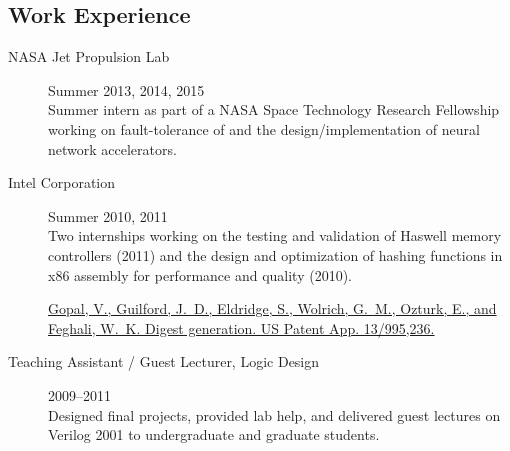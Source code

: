 \documentclass[letterpage]{article}
\begin{document}
\begin{minipage}[t]{0.59\textwidth}
\begin{description}
    \endgroup
  \end{description}

  \subsection*{Work Experience}
  \vspace{-5pt}
  \begin{description}
  \item[NASA Jet Propulsion Lab] \hfill Summer 2013, 2014, 2015\\ Summer intern as part of a NASA Space Technology Research Fellowship working on fault-tolerance of and the design/implementation of neural network accelerators.
  \item[Intel Corporation] \hfill Summer 2010, 2011\\ Two internships working on the testing and validation of Haswell memory
    controllers (2011) and the design and optimization of hashing
    functions in x86 assembly for performance and quality (2010). \begingroup
    \renewcommand{\section}[2]{}
    \begin{thebibliography}{2011}
      \href{http://www.google.com/patents/US20130290285}{Gopal, V.,
        Guilford, J.~D., Eldridge, S., Wolrich, G.~M., Ozturk, E., and
        Feghali, W.~K. Digest generation. US Patent
        App. 13/995,236.}
    \end{thebibliography}
    \endgroup
  \item[Teaching Assistant / Guest Lecturer, Logic Design] \hfill
    2009--2011\\ Designed final projects, provided lab help, and
    delivered guest lectures on Verilog 2001 to undergraduate and
    graduate students.
  \end{description}


\end{minipage}
\end{document}
